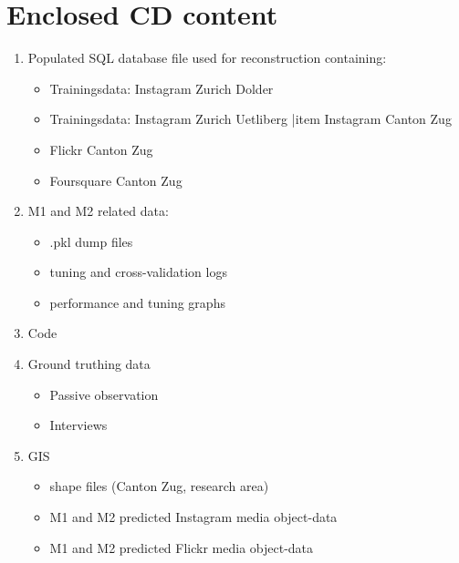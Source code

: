 \chapter*{Enclosed CD content} \label{CD_content}

\begin{enumerate}
    \item Populated SQL database file used for reconstruction containing:
    \begin{itemize}
        \item Trainingsdata: Instagram Zurich Dolder
        \item Trainingsdata: Instagram Zurich Uetliberg
        |item Instagram Canton Zug
        \item Flickr Canton Zug
        \item Foursquare Canton Zug
    \end{itemize}
    \item M1 and M2 related data:
    \begin{itemize}
        \item .pkl dump files
        \item tuning and cross-validation logs
        \item performance and tuning graphs
    \end{itemize}
    \item Code
    \item Ground truthing data
    \begin{itemize}
        \item Passive observation
        \item Interviews
    \end{itemize}
    \item GIS
    \begin{itemize}
        \item shape files (Canton Zug, research area)
        \item M1 and M2 predicted Instagram media object-data
        \item M1 and M2 predicted Flickr media object-data
    \end{itemize}
\end{enumerate}